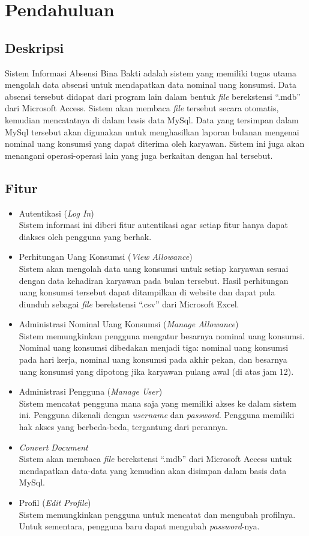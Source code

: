\section{Pendahuluan}

\subsection{Deskripsi}
Sistem Informasi Absensi Bina Bakti adalah sistem yang memiliki tugas utama mengolah data absensi untuk mendapatkan data nominal uang konsumsi. Data absensi tersebut didapat dari program lain dalam bentuk \textit{file} berekstensi ``.mdb'' dari Microsoft Access. Sistem akan membaca \textit{file} tersebut secara otomatis, kemudian mencatatnya di dalam basis data MySql. Data yang tersimpan dalam MySql tersebut akan digunakan untuk menghasilkan laporan bulanan mengenai nominal uang konsumsi yang dapat diterima oleh karyawan. Sistem ini juga akan menangani operasi-operasi lain yang juga berkaitan dengan hal tersebut.

\subsection{Fitur}
\begin{itemize}
	\item Autentikasi	(\textit{Log In})
	\\Sistem informasi ini diberi fitur autentikasi agar setiap fitur hanya dapat diakses oleh pengguna yang berhak.
	\item Perhitungan Uang Konsumsi (\textit{View Allowance})
	\\Sistem akan mengolah data uang konsumsi untuk setiap karyawan sesuai dengan data kehadiran karyawan pada bulan tersebut. Hasil perhitungan uang konsumsi tersebut dapat ditampilkan di website dan dapat pula diunduh sebagai \textit{file} berekstensi ``.csv'' dari Microsoft Excel.
	\item Administrasi Nominal Uang Konsumsi (\textit{Manage Allowance})
	\\Sistem memungkinkan pengguna mengatur besarnya nominal uang konsumsi. Nominal uang konsumsi dibedakan menjadi tiga: nominal uang konsumsi pada hari kerja, nominal uang konsumsi pada akhir pekan, dan besarnya uang konsumsi yang dipotong jika karyawan pulang awal (di atas jam 12).
	\item Administrasi Pengguna (\textit{Manage User})
	\\Sistem mencatat pengguna mana saja yang memiliki akses ke dalam sistem ini. Pengguna dikenali dengan \textit{username} dan \textit{password}. Pengguna memiliki hak akses yang berbeda-beda, tergantung dari perannya.
	\item \textit{Convert Document}
	\\Sistem akan membaca \textit{file} berekstensi ``.mdb'' dari Microsoft Access untuk mendapatkan data-data yang kemudian akan disimpan dalam basis data MySql.
	\item Profil (\textit{Edit Profile})
	\\Sistem memungkinkan pengguna untuk mencatat dan mengubah profilnya. Untuk sementara, pengguna baru dapat mengubah \textit{password}-nya.
\end{itemize}